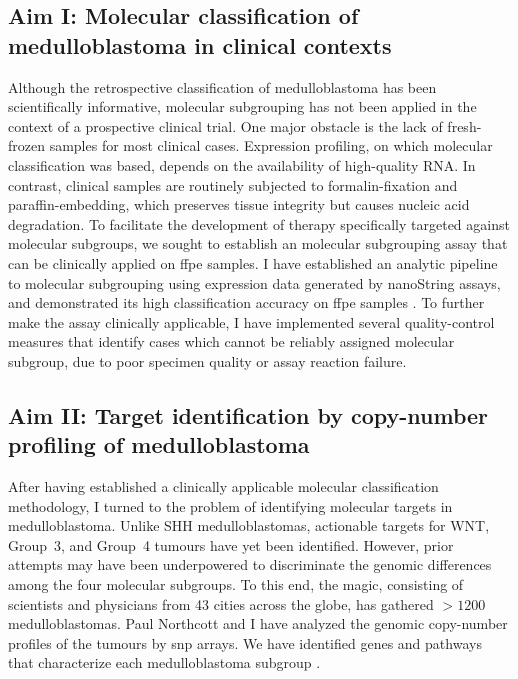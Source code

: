 \subsection*{Aim I: Molecular classification of medulloblastoma in clinical contexts}

Although the retrospective classification of medulloblastoma has been scientifically informative, molecular subgrouping has not been applied in the context of a prospective clinical trial. One major obstacle is the lack of fresh-frozen samples for most clinical cases. Expression profiling, on which molecular classification was based, depends on the availability of high-quality RNA. In contrast, clinical samples are routinely subjected to formalin-fixation and paraffin-embedding, which preserves tissue integrity but causes nucleic acid degradation. To facilitate the development of therapy specifically targeted against molecular subgroups, we sought to establish an molecular subgrouping assay that can be clinically applied on \gls{ffpe} samples. I have established an analytic pipeline to molecular subgrouping using expression data generated by nanoString assays, and demonstrated its high classification accuracy on \gls{ffpe} samples . To further make the assay clinically applicable, I have implemented several quality-control measures that identify cases which cannot be reliably assigned molecular subgroup, due to poor specimen quality or assay reaction failure.

\subsection*{Aim II: Target identification by copy-number profiling of medulloblastoma}

After having established a clinically applicable molecular classification methodology, I turned to the problem of identifying molecular targets in medulloblastoma. Unlike SHH medulloblastomas, actionable targets for WNT, Group~3, and Group~4 tumours have yet been identified. However, prior attempts may have been underpowered to discriminate the genomic differences among the four molecular subgroups. To this end, the \gls{magic}, consisting of scientists and physicians from 43 cities across the globe, has gathered $>1200$ medulloblastomas. Paul Northcott and I have analyzed the genomic copy-number profiles of the tumours by \gls{snp} arrays. We have identified genes and pathways that characterize each medulloblastoma subgroup .



